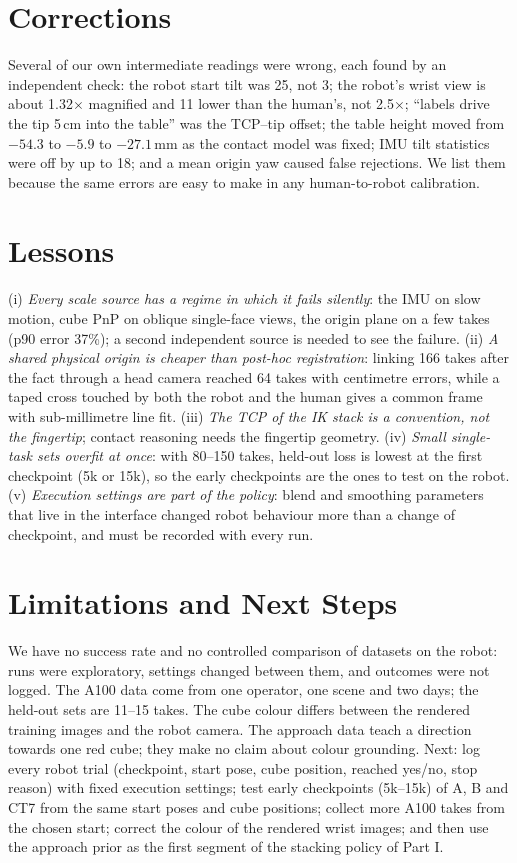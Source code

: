 \documentclass[conference,10pt]{IEEEtran}
\newcommand{\mm}{\,mm\xspace}
\begin{document}
\section{Corrections}\label{sec:corr}
Several of our own intermediate readings were wrong, each found by an independent check: the robot start tilt was 25\textdegree,
not 3\textdegree; the robot's wrist view is about 1.32$\times$ magnified and 11\textdegree{} lower than the human's, not
2.5$\times$; ``labels drive the tip 5\,cm into the table'' was the TCP--tip offset; the table height moved from $-54.3$ to
$-5.9$ to $-27.1$\mm as the contact model was fixed; IMU tilt statistics were off by up to 18\textdegree; and a mean origin yaw
caused false rejections. We list them because the same errors are easy to make in any human-to-robot calibration.

\section{Lessons}\label{sec:lessons}
(i) \emph{Every scale source has a regime in which it fails silently}: the IMU on slow motion, cube PnP on oblique single-face
views, the origin plane on a few takes (p90 error 37\%); a second independent source is needed to see the failure.
(ii) \emph{A shared physical origin is cheaper than post-hoc registration}: linking 166 takes after the fact through a head
camera reached 64 takes with centimetre errors, while a taped cross touched by both the robot and the human gives a common
frame with sub-millimetre line fit. (iii) \emph{The TCP of the IK stack is a convention, not the fingertip}; contact
reasoning needs the fingertip geometry. (iv) \emph{Small single-task sets overfit at once}: with 80--150 takes, held-out loss
is lowest at the first checkpoint (5k or 15k), so the early checkpoints are the ones to test on the robot. (v) \emph{Execution
settings are part of the policy}: blend and smoothing parameters that live in the interface changed robot behaviour more than
a change of checkpoint, and must be recorded with every run.

\section{Limitations and Next Steps}\label{sec:lim}
We have no success rate and no controlled comparison of datasets on the robot: runs were exploratory, settings changed between
them, and outcomes were not logged. The A100 data come from one operator, one scene and two days; the held-out sets are 11--15
takes. The cube colour differs between the rendered training images and the robot camera. The approach data teach a direction
towards one red cube; they make no claim about colour grounding. Next: log every robot trial (checkpoint, start pose, cube
position, reached yes/no, stop reason) with fixed execution settings; test early checkpoints (5k--15k) of A, B and CT7 from
the same start poses and cube positions; collect more A100 takes from the chosen start; correct the colour of the rendered
wrist images; and then use the approach prior as the first segment of the stacking policy of Part I.
\end{document}
